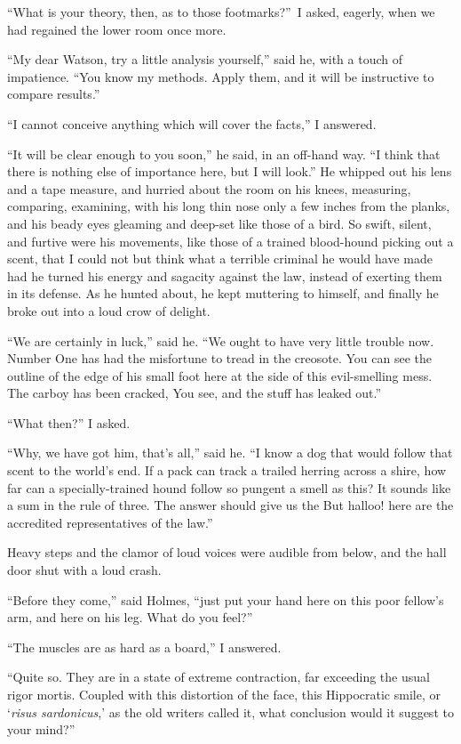 \documentclass[12pt,english,oneside]{book}
\begin{document}
{}``What is your theory, then, as to those footmarks?''\ I asked,
eagerly, when we had regained the lower room once more.

{}``My dear Watson, try a little analysis yourself,'' said he, with
a touch of impatience. {}``You know my methods. Apply them, and it
will be instructive to compare results.''

{}``I cannot conceive anything which will cover the facts,'' I answered.

{}``It will be clear enough to you soon,'' he said, in an off-hand
way. {}``I think that there is nothing else of importance here, but
I will look.'' He whipped out his lens and a tape measure, and hurried
about the room on his knees, measuring, comparing, examining, with
his long thin nose only a few inches from the planks, and his beady
eyes gleaming and deep-set like those of a bird. So swift, silent,
and furtive were his movements, like those of a trained blood-hound
picking out a scent, that I could not but think what a terrible criminal
he would have made had he turned his energy and sagacity against the
law, instead of exerting them in its defense. As he hunted about,
he kept muttering to himself, and finally he broke out into a loud
crow of delight.

{}``We are certainly in luck,'' said he. {}``We ought to have very
little trouble now. Number One has had the misfortune to tread in
the creosote. You can see the outline of the edge of his small foot
here at the side of this evil-smelling mess. The carboy has been cracked,
You see, and the stuff has leaked out.''

{}``What then?'' I asked.

{}``Why, we have got him, that's all,'' said he. {}``I know a dog
that would follow that scent to the world's end. If a pack can track
a trailed herring across a shire, how far can a specially-trained
hound follow so pungent a smell as this? It sounds like a sum in the
rule of three. The answer should give us the\mdsh{---} But halloo!
here are the accredited representatives of the law.''

Heavy steps and the clamor of loud voices were audible from below,
and the hall door shut with a loud crash.

{}``Before they come,'' said Holmes, {}``just put your hand here
on this poor fellow's arm, and here on his leg. What do you feel?''

{}``The muscles are as hard as a board,'' I answered.

{}``Quite so. They are in a state of extreme contraction, far exceeding
the usual rigor mortis. Coupled with this distortion of the face,
this Hippocratic smile, or `\emph{risus sardonicus},' as the old writers
called it, what conclusion would it suggest to your mind?''
\end{document}
